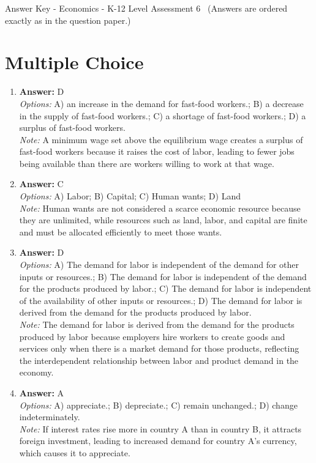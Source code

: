 \documentclass[12pt]{article}
\begin{document}
\begin{center}
Answer Key - Economics - K-12 Level Assessment 6 \
\small (Answers are ordered exactly as in the question paper.)
\end{center}

\section*{Multiple Choice}
\begin{enumerate}[label=\arabic*.]
\item \textbf{Answer:} D
\\ \textit{Options:} A) an increase in the demand for fast-food workers.; B) a decrease in the supply of fast-food workers.; C) a shortage of fast-food workers.; D) a surplus of fast-food workers.
\\ \textit{Note:} A minimum wage set above the equilibrium wage creates a surplus of fast-food workers because it raises the cost of labor, leading to fewer jobs being available than there are workers willing to work at that wage.
\item \textbf{Answer:} C
\\ \textit{Options:} A) Labor; B) Capital; C) Human wants; D) Land
\\ \textit{Note:} Human wants are not considered a scarce economic resource because they are unlimited, while resources such as land, labor, and capital are finite and must be allocated efficiently to meet those wants.
\item \textbf{Answer:} D
\\ \textit{Options:} A) The demand for labor is independent of the demand for other inputs or resources.; B) The demand for labor is independent of the demand for the products produced by labor.; C) The demand for labor is independent of the availability of other inputs or resources.; D) The demand for labor is derived from the demand for the products produced by labor.
\\ \textit{Note:} The demand for labor is derived from the demand for the products produced by labor because employers hire workers to create goods and services only when there is a market demand for those products, reflecting the interdependent relationship between labor and product demand in the economy.
\item \textbf{Answer:} A
\\ \textit{Options:} A) appreciate.; B) depreciate.; C) remain unchanged.; D) change indeterminately.
\\ \textit{Note:} If interest rates rise more in country A than in country B, it attracts foreign investment, leading to increased demand for country A's currency, which causes it to appreciate.

\end{enumerate}
\end{document}
